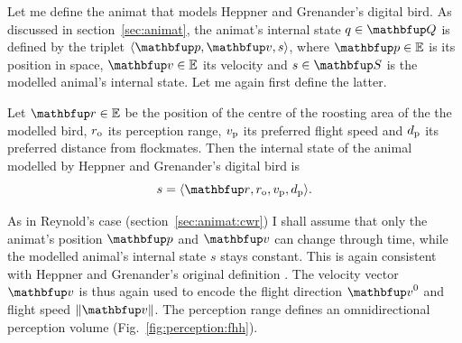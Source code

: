 Let me define the animat that models Heppner and Grenander's digital bird. As discussed in section~\ref{sec:animat}, the animat's internal state $q \in \set{Q}$ is defined by the triplet $\langle \vect{p}, \vect{v}, s \rangle$, where $\vect{p} \in \E$ is its position in space, $\vect{v} \in \E$ its velocity and $s \in \set{S}$ is the modelled animal's internal state. Let me again first define the latter. 

\begin{definition}
\label{def:animat:s:fhh}
Let $\vect{r} \in \E$ be the position of the centre of the roosting area of the the modelled bird, $r_\textnormal{o}$ its perception range, $v_\textnormal{p}$ its preferred flight speed and $d_\textnormal{p}$ its preferred distance from flockmates. Then the internal state of the animal modelled by Heppner and Grenander's digital bird is
\begin{equation}
s=\langle \vect{r}, r_\textnormal{o}, v_\textnormal{p}, d_\textnormal{p} \rangle.
\end{equation}
\end{definition}

As in Reynold's case (section~\ref{sec:animat:cwr}) I shall assume that only the animat's position $\vect{p}$ and $\vect{v}$ can change through time, while the 	modelled animal's internal state $s$ stays constant. This is again consistent with Heppner and Grenander's original definition \cite{heppner:1990}. 
The velocity vector $\vect{v}$ is thus again used to encode the flight direction $\vect{v}^0$ and flight speed $\left\|\vect{v}\right\|$. The perception range defines an omnidirectional perception volume (Fig.~\ref{fig:perception:fhh}).

